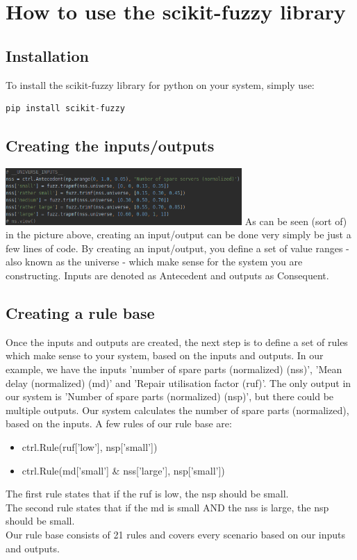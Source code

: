 \documentclass[fleqn,10pt]{SelfArx} %
\begin{document}
\section{How to use the scikit-fuzzy library}

\subsection{Installation}
To install the scikit-fuzzy library for python on your system, simply use: 
\begin{lstlisting}[language=Python]
pip install scikit-fuzzy
\end{lstlisting}

\subsection{Creating the inputs/outputs}
\includegraphics[width=9cm]{Paper/images/universe.png}
As can be seen (sort of) in the picture above, creating an input/output can be done very simply be just a few lines of code. By creating an input/output, you define a set of value ranges - also known as the universe - which make sense for the system you are constructing.
Inputs are denoted as Antecedent and outputs as Consequent.
\subsection{Creating a rule base}
Once the inputs and outputs are created, the next step is to define a set of rules which make sense to your system, based on the inputs and outputs.
In our example, we have the inputs 'number of spare parts (normalized) (nss)', 'Mean delay (normalized) (md)' and 'Repair utilisation factor (ruf)'. The only output in our system is 'Number of spare parts (normalized) (nsp)', but there could be multiple outputs. 
Our system calculates the number of spare parts (normalized), based on the inputs. A few rules of our rule base are:

\begin{itemize}
    \item ctrl.Rule(ruf['low'], nsp['small'])
    \item ctrl.Rule(md['small'] \& nss['large'], nsp['small'])
\end{itemize}
The first rule states that if the ruf is low, the nsp should be small.\\
The second rule states that if the md is small AND the nss is large, the nsp should be small.\\
Our rule base consists of 21 rules and covers every scenario based on our inputs and outputs. 
\end{document}
